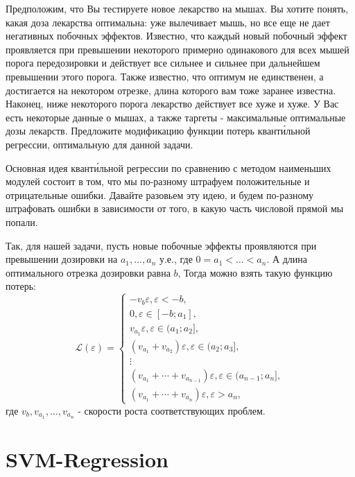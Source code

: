 Предположим, что Вы тестируете новое лекарство на мышах. Вы хотите понять, какая доза лекарства оптимальна: уже вылечивает мышь, но все еще не дает негативных побочных эффектов. Известно, что каждый новый побочный эффект проявляется при превышении некоторого примерно одинакового для всех мышей порога передозировки и действует все сильнее и сильнее при дальнейшем превышении этого порога. Также известно, что оптимум не единственен, а достигается на некотором отрезке, длина которого вам тоже заранее известна. Наконец, ниже некоторого порога лекарство действует все хуже и хуже. У Вас есть некоторые данные о мышах, а также таргеты - максимальные оптимальные дозы лекарств. Предложите модификацию функции потерь квант\'{и}льной регрессии, оптимальную для данной задачи.

\begin{solution}
    Основная идея квант\'{и}льной регрессии по сравнению с методом наименьших модулей состоит в том, что мы по-разному штрафуем положительные и отрицательные ошибки. Давайте разовьем эту идею, и будем по-разному штрафовать ошибки в зависимости от того, в какую часть числовой прямой мы попали.

    Так, для нашей задачи, пусть новые побочные эффекты проявляются при превышении дозировки на $a_1, \dotsc, a_n$ у.е., где $0= a_1 < \ldots < a_n$. А длина оптимального отрезка дозировки равна $b$, Тогда можно взять такую функцию потерь:
    $$\mathscr{L}(\varepsilon) = \begin{cases}
        -v_b\varepsilon, \varepsilon < -b,\\
        0, \varepsilon \in [-b; a_1],\\
        v_{a_1}\varepsilon, \varepsilon \in (a_1; a_2],\\
        (v_{a_1} + v_{a_2})\varepsilon, \varepsilon \in (a_2; a_3],\\
        \vdots\\
        (v_{a_1} + \dotsb + v_{a_{n - 1}})\varepsilon, \varepsilon \in (a_{n-1}; a_n],\\
        (v_{a_1} + \dotsb + v_{a_n})\varepsilon, \varepsilon > a_n,
    \end{cases}$$
    где $v_b, v_{a_1}, \dotsc, v_{a_n}$ - скорости роста соответствующих проблем.
\end{solution}

\newpage
\section*{SVM-Regression}

